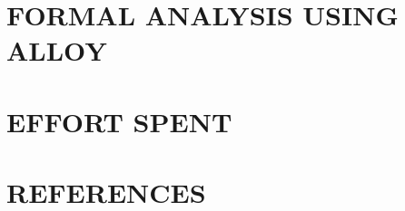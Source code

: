 \documentclass{article}
\begin{document}
\section{FORMAL ANALYSIS USING ALLOY}

\section{EFFORT SPENT}

\section{REFERENCES}
\end{document}
